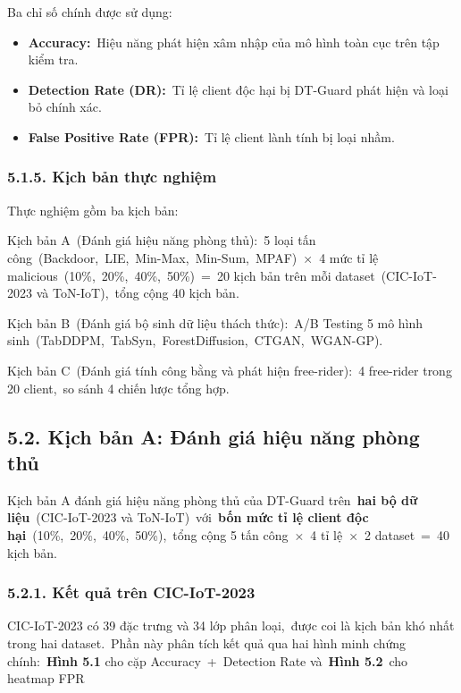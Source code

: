 Ba chỉ số chính được sử dụng:

\begin{itemize}
\item
  \textbf{Accuracy:}~Hiệu năng phát hiện xâm nhập của mô hình toàn cục trên tập kiểm tra.
\item
  \textbf{Detection Rate (DR):}~Tỉ lệ client độc hại bị DT-Guard phát hiện và loại bỏ chính xác.
\item
  \textbf{False Positive Rate (FPR):}~Tỉ lệ client lành tính bị loại nhầm.
\end{itemize}

\subsubsection{5.1.5. Kịch bản thực nghiệm}\label{kux1ecbch-bux1ea3n-thux1ef1c-nghiux1ec7m}

Thực nghiệm gồm ba kịch bản:

Kịch bản A~(Đánh giá hiệu năng phòng thủ):~5 loại tấn công~(Backdoor,~LIE,~Min-Max,~Min-Sum,~MPAF)~×~4 mức tỉ lệ malicious~(10\%,~20\%,~40\%,~50\%)~=~20 kịch bản trên mỗi dataset~(CIC-IoT-2023 và ToN-IoT),~tổng cộng 40 kịch bản.

Kịch bản B~(Đánh giá bộ sinh dữ liệu thách thức):~A/B Testing 5 mô hình sinh~(TabDDPM,~TabSyn,~ForestDiffusion,~CTGAN,~WGAN-GP).

Kịch bản C~(Đánh giá tính công bằng và phát hiện free-rider):~4 free-rider trong 20 client,~so sánh 4 chiến lược tổng hợp.

\subsection{5.2. Kịch bản A: Đánh giá hiệu năng phòng thủ}\label{kux1ecbch-bux1ea3n-a-ux111uxe1nh-giuxe1-hiux1ec7u-nux103ng-phuxf2ng-thux1ee7}

Kịch bản A đánh giá hiệu năng phòng thủ của DT-Guard trên~\textbf{hai bộ dữ liệu}~(CIC-IoT-2023 và ToN-IoT)~với~\textbf{bốn mức tỉ lệ client độc hại}~(10\%,~20\%,~40\%,~50\%),~tổng cộng 5 tấn công~×~4 tỉ lệ~×~2 dataset~=~40 kịch bản.

\subsubsection{5.2.1. Kết quả trên CIC-IoT-2023}\label{kux1ebft-quux1ea3-truxean-cic-iot-2023}

CIC-IoT-2023 có 39 đặc trưng và 34 lớp phân loại,~được coi là kịch bản khó nhất trong hai dataset.~Phần này phân tích kết quả qua hai hình minh chứng chính:~\textbf{Hình 5.1} cho cặp Accuracy~+~Detection Rate và~\textbf{Hình 5.2}~cho heatmap FPR

